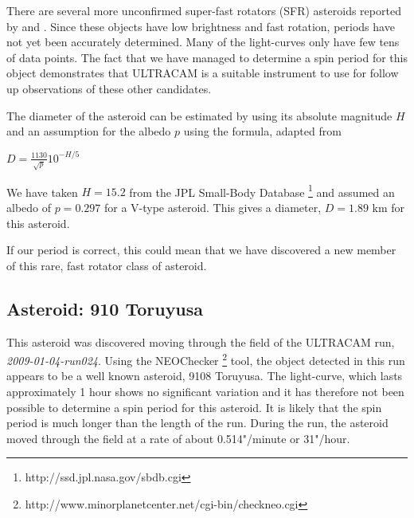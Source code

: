 There are several more unconfirmed super-fast rotators (SFR) asteroids reported by \citet{Masiero2009} and \citet{Dermawan2011}. Since these objects have low brightness and fast rotation, periods have not yet been accurately determined. Many of the light-curves only have few tens of data points. The fact that we have managed to determine a spin period for this object demonstrates that ULTRACAM is a suitable instrument to use for follow up observations of these other candidates.  

The diameter of the asteroid can be estimated by using its absolute magnitude $H$ and an assumption for the albedo $p$ using the formula, adapted from \citet{Jewitt2013}

$D = \frac{1130}{\sqrt{p}}10^{-H/5} $

We have taken $H = 15.2$ from the JPL Small-Body Database \footnote{http://ssd.jpl.nasa.gov/sbdb.cgi} and assumed an albedo of $ p = 0.297$ for a V-type asteroid. This gives a diameter, $D = 1.89$ km for this asteroid. 

If our period is correct, this could mean that we have discovered a new member of this rare, fast rotator class of asteroid. 

\subsection{Asteroid: 910 Toruyusa}
  
This asteroid was discovered moving through the field of the ULTRACAM run, \emph{ 2009-01-04-run024}. Using the NEOChecker \footnote{http://www.minorplanetcenter.net/cgi-bin/checkneo.cgi} tool, the object detected in this run appears to be a well known asteroid, 9108 Toruyusa. The light-curve, which lasts approximately 1 hour shows no significant variation and it has therefore not been possible to determine a spin period for this asteroid. It is likely that the spin period is much longer than the length of the run. During the run, the asteroid moved through the field at a rate of about  0.514"/minute or 31"/hour. 

 
